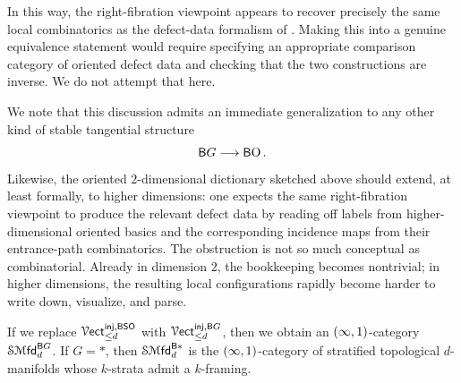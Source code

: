 \medskip

\nid In this way, the right-fibration viewpoint appears to recover precisely the same local combinatorics as the defect-data formalism of \cite{CRS19}. Making this into a genuine equivalence statement would require specifying an appropriate comparison category of oriented defect data and checking that the two constructions are inverse. We do not attempt that here.

\begin{observation}
We note that this discussion admits an immediate generalization to any other kind of stable tangential structure 
\begin{equation}
    \mathsf B G \longrightarrow \operatorname{{\mathsf BO}}.
\end{equation}
Likewise, the oriented $2$-dimensional dictionary sketched above should extend, at least formally, to higher dimensions: one expects the same right-fibration viewpoint to produce the relevant defect data by reading off labels from higher-dimensional oriented basics and the corresponding incidence maps from their entrance-path combinatorics. The obstruction is not so much conceptual as combinatorial. Already in dimension $2$, the bookkeeping becomes nontrivial; in higher dimensions, the resulting local configurations rapidly become harder to write down, visualize, and parse.

\medskip

\nid If we replace $\operatorname{\mathcal V{\sf ect}}^{\operatorname{\mathsf{inj}},\mathsf B\mathsf S\mathsf O}_{\le d}$ with $\operatorname{\mathcal V{\sf ect}}^{\operatorname{\mathsf{inj}},\mathsf B G}_{\le d}$, then we obtain an $(\operatorname{\infty},1)$-category ${\mathcal S\!\operatorname{{\mathcal M}\mathsf{fd}}}_{d}^{\mathsf B G}$. If $G=*$, then ${\mathcal S\!\operatorname{{\mathcal M}\mathsf{fd}}}_d^{\mathsf B *}$ is the $(\operatorname{\infty},1)$-category of stratified topological $d$-manifolds whose $k$-strata admit a $k$-framing. 
\end{observation}

